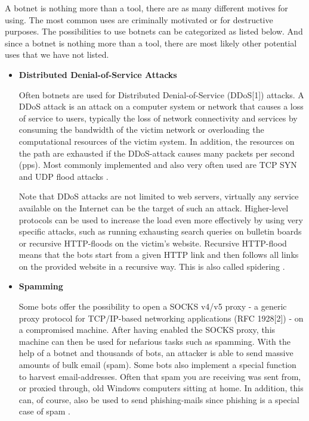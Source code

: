 \documentclass[]{article}
\begin{document}
A botnet is nothing more than a tool, there are as many different motives for using. The most common uses are criminally motivated or for destructive purposes. The possibilities to use botnets can be categorized as listed below. And since a botnet is nothing more than a tool, there are most likely other potential uses that we have not listed.


\begin{itemize}
	
\item{ \textbf{Distributed Denial-of-Service Attacks}

Often botnets are used for Distributed Denial-of-Service (DDoS[1]) attacks. A DDoS attack is an attack on a computer system or network that causes a loss of service to users, typically the loss of network connectivity and services by consuming the bandwidth of the victim network or overloading the computational resources of the victim system. In addition, the resources on the path are exhausted if the DDoS-attack causes many packets per second (pps). Most commonly implemented and also very often used are TCP SYN and UDP flood attacks \cite{website:ddos}.

Note that DDoS attacks are not limited to web servers, virtually any service available on the Internet can be the target of such an attack. Higher-level protocols can be used to increase the load even more effectively by using very specific attacks, such as running exhausting search queries on bulletin boards or recursive HTTP-floods on the victim’s website. Recursive HTTP-flood means that the bots start from a given HTTP link and then follows all links on the provided website in a recursive way. This is also called spidering \cite{website:ddos}.
}
\item \textbf{Spamming}

Some bots offer the possibility to open a SOCKS v4/v5 proxy - a generic proxy protocol for TCP/IP-based networking applications (RFC 1928[2]) - on a compromised machine. After having enabled the SOCKS proxy, this machine can then be used for nefarious tasks such as spamming. With the help of a botnet and thousands of bots, an attacker is able to send massive amounts of bulk email (spam). Some bots also implement a special function to harvest email-addresses. Often that spam you are receiving was sent from, or proxied through, old Windows computers sitting at home. In addition, this can, of course, also be used to send phishing-mails since phishing is a special case of spam \cite{website:spam} \cite{article:honeypot-tracking}.


\end{itemize}
\end{document}
